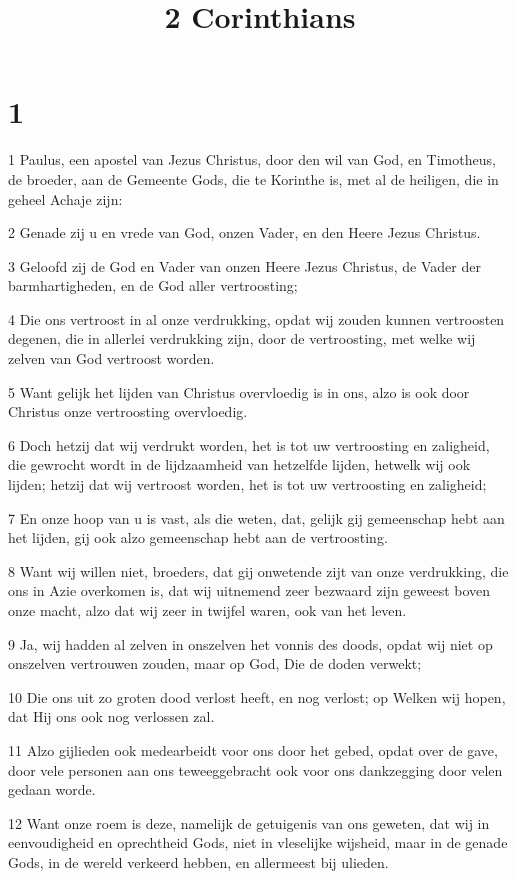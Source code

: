 

\title{2 Corinthians}



\chapter{1}

\par 1 Paulus, een apostel van Jezus Christus, door den wil van God, en Timotheus, de broeder, aan de Gemeente Gods, die te Korinthe is, met al de heiligen, die in geheel Achaje zijn:
\par 2 Genade zij u en vrede van God, onzen Vader, en den Heere Jezus Christus.
\par 3 Geloofd zij de God en Vader van onzen Heere Jezus Christus, de Vader der barmhartigheden, en de God aller vertroosting;
\par 4 Die ons vertroost in al onze verdrukking, opdat wij zouden kunnen vertroosten degenen, die in allerlei verdrukking zijn, door de vertroosting, met welke wij zelven van God vertroost worden.
\par 5 Want gelijk het lijden van Christus overvloedig is in ons, alzo is ook door Christus onze vertroosting overvloedig.
\par 6 Doch hetzij dat wij verdrukt worden, het is tot uw vertroosting en zaligheid, die gewrocht wordt in de lijdzaamheid van hetzelfde lijden, hetwelk wij ook lijden; hetzij dat wij vertroost worden, het is tot uw vertroosting en zaligheid;
\par 7 En onze hoop van u is vast, als die weten, dat, gelijk gij gemeenschap hebt aan het lijden, gij ook alzo gemeenschap hebt aan de vertroosting.
\par 8 Want wij willen niet, broeders, dat gij onwetende zijt van onze verdrukking, die ons in Azie overkomen is, dat wij uitnemend zeer bezwaard zijn geweest boven onze macht, alzo dat wij zeer in twijfel waren, ook van het leven.
\par 9 Ja, wij hadden al zelven in onszelven het vonnis des doods, opdat wij niet op onszelven vertrouwen zouden, maar op God, Die de doden verwekt;
\par 10 Die ons uit zo groten dood verlost heeft, en nog verlost; op Welken wij hopen, dat Hij ons ook nog verlossen zal.
\par 11 Alzo gijlieden ook medearbeidt voor ons door het gebed, opdat over de gave, door vele personen aan ons teweeggebracht ook voor ons dankzegging door velen gedaan worde.
\par 12 Want onze roem is deze, namelijk de getuigenis van ons geweten, dat wij in eenvoudigheid en oprechtheid Gods, niet in vleselijke wijsheid, maar in de genade Gods, in de wereld verkeerd hebben, en allermeest bij ulieden.
